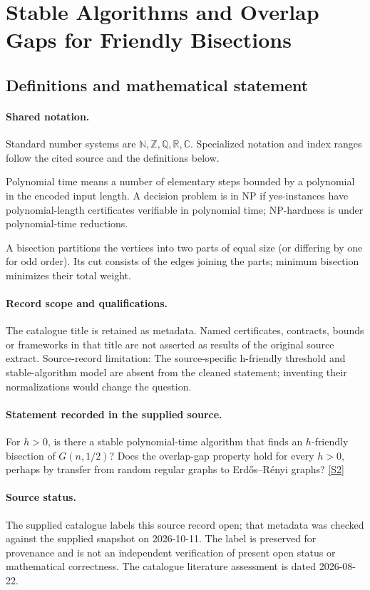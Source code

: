 \documentclass[11pt]{article}
\newcommand{\sref}[2]{\hyperlink{source:#1:#2}{[S#2]}}
\begin{document}
\section{Stable Algorithms and Overlap Gaps for Friendly Bisections}\label{statement}

\subsection{Definitions and mathematical statement}

\paragraph{Shared notation.}Standard number systems are $\mathbb N,\mathbb Z,\mathbb Q,\mathbb R,\mathbb C$. Specialized notation and index ranges follow the cited source and the definitions below.


Polynomial time means a number of elementary steps bounded by a polynomial in the encoded input length. A decision problem is in $\mathrm{NP}$ if yes-instances have polynomial-length certificates verifiable in polynomial time; NP-hardness is under polynomial-time reductions.

A bisection partitions the vertices into two parts of equal size (or differing by one for odd order). Its cut consists of the edges joining the parts; minimum bisection minimizes their total weight.
\paragraph{Record scope and qualifications.}
The catalogue title is retained as metadata. Named certificates, contracts, bounds or frameworks in that title are not asserted as results of the original source extract.
Source-record limitation: The source-specific h-friendly threshold and stable-algorithm model are absent from the cleaned statement; inventing their normalizations would change the question.
\paragraph{Statement recorded in the supplied source.}
For $h>0$, is there a stable polynomial-time algorithm that finds an $h$-friendly bisection of $G(n,1/2)$? Does the overlap-gap property hold for every $h>0$, perhaps by transfer from random regular graphs to Erdős–Rényi graphs? \sref{statement}{2}
\paragraph{Source status.}
The supplied catalogue labels this source record open; that metadata was checked against the supplied snapshot on 2026-10-11. The label is preserved for provenance and is not an independent verification of present open status or mathematical correctness. The catalogue literature assessment is dated 2026-08-22.
\end{document}
